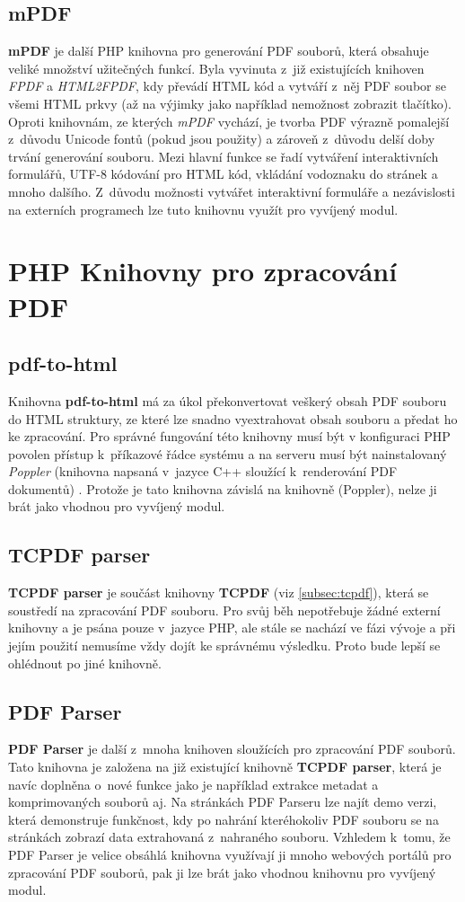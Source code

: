 \subsection{mPDF}
\textbf{mPDF} je další PHP knihovna pro generování PDF souborů, která obsahuje veliké množství užitečných funkcí. Byla vyvinuta z~již existujících knihoven \textit{FPDF} a \textit{HTML2FPDF}, kdy převádí HTML kód a vytváří z~něj PDF soubor se všemi HTML prkvy (až na výjimky jako například nemožnost zobrazit tlačítko). Oproti knihovnám, ze kterých \textit{mPDF} vychází, je tvorba PDF výrazně pomalejší z~důvodu Unicode fontů (pokud jsou použity) a zároveň z~důvodu delší doby trvání generování souboru. Mezi hlavní funkce se řadí vytváření interaktivních formulářů, UTF-8 kódování pro HTML kód, vkládání vodoznaku do stránek a mnoho dalšího. Z~důvodu možnosti vytvářet interaktivní formuláře a nezávislosti na externích programech lze tuto knihovnu využít pro vyvíjený modul.
\section{PHP Knihovny pro zpracování PDF}
\subsection{pdf-to-html}
Knihovna \textbf{pdf-to-html} má za úkol překonvertovat veškerý obsah PDF souboru do HTML struktury, ze které lze snadno vyextrahovat obsah souboru a předat ho ke zpracování. Pro správné fungování této knihovny musí být v konfiguraci PHP povolen přístup k~příkazové řádce systému a na serveru musí být nainstalovaný \textit{Poppler} (knihovna napsaná v~jazyce C++ sloužící k~renderování PDF dokumentů) \cite{pdfToHtml}. Protože je tato knihovna závislá na knihovně (Poppler), nelze ji brát jako vhodnou pro vyvíjený modul. 
\subsection{TCPDF parser}
\textbf{TCPDF parser} je součást knihovny \textbf{TCPDF} (viz \ref{subsec:tcpdf}), která se soustředí na zpracování PDF souboru. Pro svůj běh nepotřebuje žádné externí knihovny a je psána pouze v~jazyce PHP, ale stále se nachází ve fázi vývoje a při jejím použití nemusíme vždy dojít ke správnému výsledku. Proto bude lepší se ohlédnout po jiné knihovně.

\subsection{PDF Parser}
\textbf{PDF Parser} je další z~mnoha knihoven sloužících pro zpracování PDF souborů. Tato knihovna je založena na již existující knihovně \textbf{TCPDF parser}, která je navíc doplněna o~nové funkce jako je například extrakce metadat a komprimovaných souborů aj. Na stránkách PDF Parseru lze najít demo verzi, která demonstruje funkčnost, kdy po nahrání kteréhokoliv PDF souboru se na stránkách zobrazí data extrahovaná z~nahraného souboru. Vzhledem k~tomu, že PDF Parser je velice obsáhlá knihovna využívají ji mnoho webových portálů pro zpracování PDF souborů, pak ji lze brát jako vhodnou knihovnu pro vyvíjený modul.
